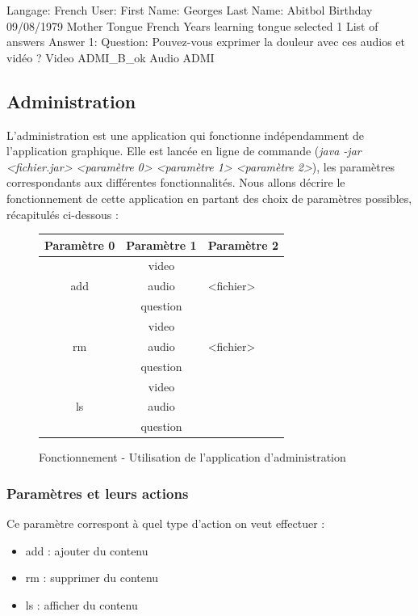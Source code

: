  \begin{verbnobox}[\small]
  Langage:   French
  User:
      First Name:   Georges
      Last Name:   Abitbol
      Birthday   09/08/1979
      Mother Tongue   French
      Years learning tongue selected   1
  List of answers
      Answer 1:
	    Question:   Pouvez-vous exprimer la douleur avec ces audios et vidéo ?
	    Video   ADMI_B_ok
	    Audio   ADMI

 \end{verbnobox}
 
 
\subsection{Administration}\label{fonction_admi}

L'administration est une application qui fonctionne indépendamment de l'application graphique. Elle est lancée en ligne de commande (\textit{java -jar <fichier.jar> <paramètre 0> <paramètre 1> <paramètre 2>}), les paramètres correspondants aux différentes fonctionnalités. Nous allons décrire le fonctionnement de cette application en partant des choix de paramètres possibles, récapitulés ci-dessous :

\begin{figure}[!ht]
\begin{center}
\begin{tabularx}{7cm}{|c|c|X|}
 \hline
 Paramètre 0 & Paramètre 1 & Paramètre 2\\
 \hline
	& video		& \tabularnewline
 add	& audio		& <fichier>\tabularnewline
	& question	& \tabularnewline
\hline
	& video		& \tabularnewline
 rm	& audio		& <fichier>\tabularnewline
	& question	& \tabularnewline
\hline
	& video		& \tabularnewline
 ls	& audio		& \tabularnewline
	& question	& \tabularnewline
 \hline
\end{tabularx}
\end{center}
\caption{Fonctionnement - Utilisation de l'application d'administration}
\end{figure}


\subsubsection{Paramètres et leurs actions}

Ce paramètre correspont à quel type d'action on veut effectuer :
\begin{itemize}
 \item add : ajouter du contenu
 \item rm  : supprimer du contenu
 \item ls  : afficher du contenu
\end{itemize}


